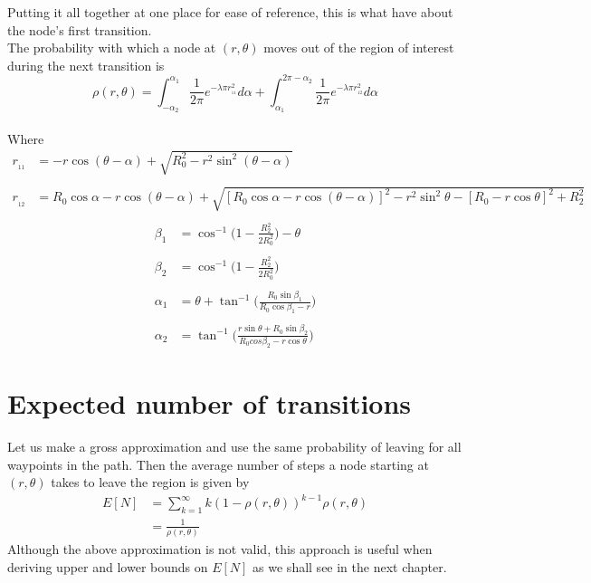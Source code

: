 \newpage
Putting it all together at one place for ease of reference, this is what have about the node's
first transition. \\
The probability with which a 
node at $(r,\theta)$ moves out of the region of interest during the next transition is 
\begin{equation} \label{eq:oneOutProb}
	\rho(r,\theta) = \int_{-\alpha_2}^{\alpha_1} \frac{1}{2\pi} e^{-\lambda \pi r_{\!_{11}}^2} d\alpha +  \int^{2\pi-\alpha_2}_{\alpha_1} \frac{1}{2\pi} e^{-\lambda \pi r_{\!_{12}}^2} d\alpha
\end{equation}
\\
Where
\begin{align*}
	r_{\!_{11}} &= -r\cos(\theta -\alpha) + \sqrt{R_0^2 - r^2\sin^2(\theta - \alpha)} \\
	&\\
	r_{\!_{12}} &= R_0 \cos \alpha - r\cos(\theta - \alpha)  +  \sqrt{[R_0 \cos \alpha - r\cos(\theta-\alpha) ]^2 - r^2\sin^2 \theta - [R_0 - r\cos \theta]^2 + R_2^2} \\
\end{align*}
\begin{align*}
	\beta_1 &= \cos^{-1}\bigg(1-\frac{R_2^2}{2R_0^2}\bigg) - \theta \\
	& \\
		\beta_2 &= \cos^{-1}\bigg(1-\frac{R_2^2}{2R_0^2}\bigg) \\
	& \\
	\alpha_1 &= \theta + \tan^{-1}\bigg( \frac{R_0\sin\beta_1}{R_0\cos\beta_1-r}\bigg)\\
			& \\
			\alpha_2 &= \tan^{-1}\bigg( \frac{r\sin\theta + R_0\sin\beta_2}{R_0cos\beta_2 - r\cos\theta} \bigg)
\end{align*}

\section{Expected number of transitions}
Let us make a gross approximation and use the same probability of leaving for all waypoints
in the path. Then the average number of steps a node starting at $(r,\theta)$ takes to leave the region is given by
\begin{align*}
	E[N] &= \sum_{k=1}^{\infty} k(1-\rho(r,\theta))^{k-1} \rho(r,\theta) \\[2ex]
	&= \frac{1}{\rho(r,\theta)}
\end{align*}
Although the above approximation is not valid, this approach is useful when deriving upper and lower bounds on $E[N]$ as we shall see in the next chapter.
